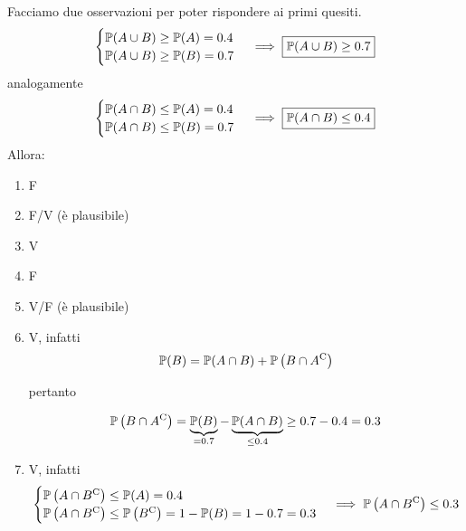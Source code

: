 Facciamo due osservazioni per poter rispondere ai primi quesiti.
\begin{equation*}
\begin{cases}
\P( A\cup B) \geq \P( A) =0.4\\
\P( A\cup B) \geq \P( B) =0.7
\end{cases} \implies  \boxed{\P( A\cup B) \geq 0.7}
\end{equation*}
analogamente
\begin{equation*}
\begin{cases}
\P( A\cap B) \leq \P( A) =0.4\\
\P( A\cap B) \leq \P( B) =0.7
\end{cases} \implies  \boxed{\P( A\cap B) \leq 0.4}
\end{equation*}
Allora:
\begin{enumerate}
\item F
\item F/V (è plausibile)
\item V
\item F
\item V/F (è plausibile)
\item V, infatti\begin{equation*}
\P( B) =\P( A\cap B) +\P\left( B\cap A\comp\right)
\end{equation*}

pertanto

\begin{equation*}
\P\left( B\cap A\comp\right) =\underbrace{\P( B)}_{=0.7} -\underbrace{\P( A\cap B)}_{\leq 0.4} \geq 0.7-0.4=0.3
\end{equation*}
\item V, infatti\begin{equation*}
\begin{cases}
\P\left( A\cap B\comp\right) \leq \P( A) =0.4\\
\P\left( A\cap B\comp\right) \leq \P\left( B\comp\right) =1-\P( B) =1-0.7=0.3
\end{cases}\mathbb{\implies  P}\left( A\cap B\comp\right) \leq 0.3
\end{equation*}
\end{enumerate}
\Soluzione
